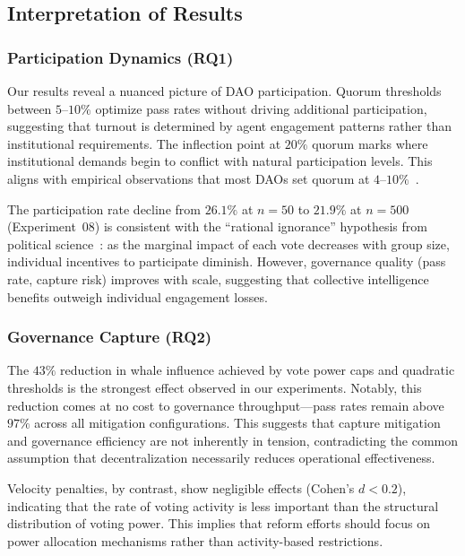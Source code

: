 
\subsection{Interpretation of Results}

\subsubsection{Participation Dynamics (RQ1)}

Our results reveal a nuanced picture of DAO participation. Quorum thresholds between $5$--$10\%$ optimize pass rates without driving additional participation, suggesting that turnout is determined by agent engagement patterns rather than institutional requirements. The inflection point at $20\%$ quorum marks where institutional demands begin to conflict with natural participation levels. This aligns with empirical observations that most DAOs set quorum at $4$--$10\%$~\citep{barbereau2022dao}.

The participation rate decline from $26.1\%$ at $n=50$ to $21.9\%$ at $n=500$ (Experiment~08) is consistent with the ``rational ignorance'' hypothesis from political science~\citep{downs1957economic}: as the marginal impact of each vote decreases with group size, individual incentives to participate diminish. However, governance quality (pass rate, capture risk) improves with scale, suggesting that collective intelligence benefits outweigh individual engagement losses.

\subsubsection{Governance Capture (RQ2)}

The $43\%$ reduction in whale influence achieved by vote power caps and quadratic thresholds is the strongest effect observed in our experiments. Notably, this reduction comes at no cost to governance throughput---pass rates remain above $97\%$ across all mitigation configurations. This suggests that capture mitigation and governance efficiency are not inherently in tension, contradicting the common assumption that decentralization necessarily reduces operational effectiveness.

Velocity penalties, by contrast, show negligible effects (Cohen's $d < 0.2$), indicating that the rate of voting activity is less important than the structural distribution of voting power. This implies that reform efforts should focus on power allocation mechanisms rather than activity-based restrictions.

